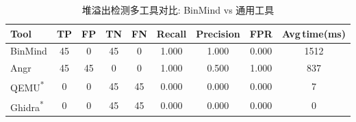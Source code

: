\begin{table}[ht]
\centering
\small
\begin{tabular}{lcccccccc}
\hline
Tool & TP & FP & TN & FN & Recall & Precision & FPR & Avg\,time(ms) \\
\hline
BinMind & 45 & 0 & 45 & 0 & 1.000 & 1.000 & 0.000 & 1512 \\
Angr & 45 & 45 & 0 & 0 & 1.000 & 0.500 & 1.000 & 837 \\
QEMU\textsuperscript{*}  & 0 & 0 & 45 & 45 & 0.000 & 0.000 & 0.000 & 7 \\
Ghidra\textsuperscript{*}  & 0 & 0 & 45 & 45 & 0.000 & 0.000 & 0.000 & 0 \\
\hline
\end{tabular}
\caption{堆溢出检测多工具对比: BinMind vs 通用工具}
\label{tab:heap-comparison}
\end{table}

